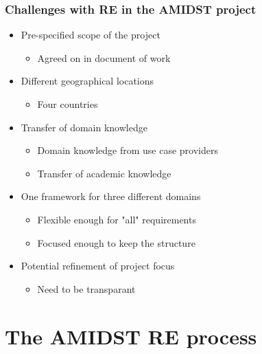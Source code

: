 \documentclass{beamer}
\begin{document}
\begin{frame} \frametitle{Challenges with RE in the AMIDST project} 
\vspace{-1cm}
\begin{itemize}
\item<1-> Pre-specified scope of the project
\begin{itemize}
\item<1-> Agreed on in document of work
\end{itemize}
\item<2-> Different geographical locations
\begin{itemize}
\item<2-> Four countries 
\end{itemize}
\item<3-> Transfer of domain knowledge
\begin{itemize}
\item<3-> Domain knowledge from use case providers
\item<3-> Transfer of academic knowledge
\end{itemize}
\item<4-> One framework for three different domains
\begin{itemize}
\item<4-> Flexible enough for "all" requirements
\item<4-> Focused enough to keep the structure
\end{itemize}
\item<5-> Potential refinement of project focus
\begin{itemize}
\item<5-> Need to be transparant
\end{itemize}
\end{itemize}
\end{frame}



\section{The AMIDST RE process}
\end{document}
